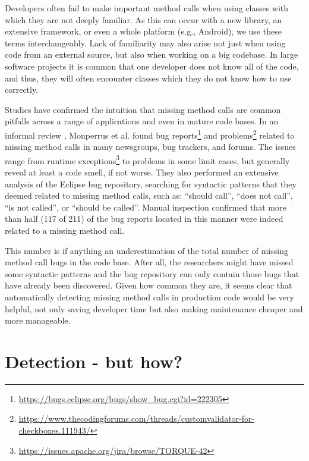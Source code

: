 Developers often fail to make important method calls when using classes with which they are not deeply familiar.
As this can occur with a new library, an extensive framework, or even a whole platform (e.g., Android), we use these terms interchangeably.
Lack of familiarity may also arise not just when using code from an external source, but also when working on a big codebase.
In large software projects it is common that one developer does not know all of the code, and thus, they will often encounter classes which they do not know how to use correctly.

Studies have confirmed the intuition that missing method calls are common pitfalls across a range of applications and even in mature code bases.
In an informal review \cite{monperrus2010detecting}, Monperrus et al. found bug reports\footnote{\url{https://bugs.eclipse.org/bugs/show_bug.cgi?id=222305}} and problems\footnote{\url{https://www.thecodingforums.com/threads/customvalidator-for-checkboxes.111943/}} related to missing method calls in many newsgroups, bug trackers, and forums.
The issues range from runtime exceptions\footnote{\url{https://issues.apache.org/jira/browse/TORQUE-42}} to problems in some limit cases, but generally reveal at least a code smell, if not worse.
They also performed an extensive analysis \cite{monperrus2013detecting} of the Eclipse bug repository,
searching for syntactic patterns that they deemed related to missing method calls, such as: ``should call'', ``does not call'', ``is not called'', or ``should be called''.
Manual inspection confirmed that more than half (117 of 211) of the bug reports located in this manner were indeed related to a missing method call.

This number is if anything an underestimation of the total number of missing method call bugs in the code base.
After all, the researchers might have missed some syntactic patterns and the bug repository can only contain those bugs that have already been discovered.
Given how common they are, it seems clear that automatically detecting missing method calls in production code would be very helpful, not only saving developer time but also making maintenance cheaper and more manageable.

\section{Detection - but how?}

